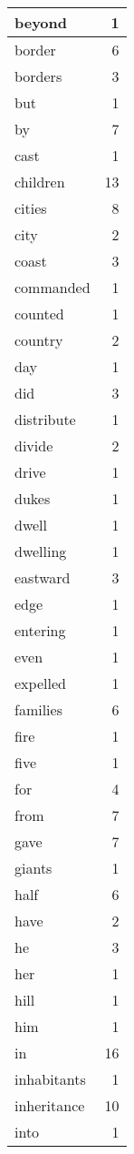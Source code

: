 \begin{center}
\begin{longtable}{l|r}
beyond & 1\\ \hline 
border & 6\\ \hline 
borders & 3\\ \hline 
but & 1\\ \hline 
by & 7\\ \hline 
cast & 1\\ \hline 
children & 13\\ \hline 
cities & 8\\ \hline 
city & 2\\ \hline 
coast & 3\\ \hline 
commanded & 1\\ \hline 
counted & 1\\ \hline 
country & 2\\ \hline 
day & 1\\ \hline 
did & 3\\ \hline 
distribute & 1\\ \hline 
divide & 2\\ \hline 
drive & 1\\ \hline 
dukes & 1\\ \hline 
dwell & 1\\ \hline 
dwelling & 1\\ \hline 
eastward & 3\\ \hline 
edge & 1\\ \hline 
entering & 1\\ \hline 
even & 1\\ \hline 
expelled & 1\\ \hline 
families & 6\\ \hline 
fire & 1\\ \hline 
five & 1\\ \hline 
for & 4\\ \hline 
from & 7\\ \hline 
gave & 7\\ \hline 
giants & 1\\ \hline 
half & 6\\ \hline 
have & 2\\ \hline 
he & 3\\ \hline 
her & 1\\ \hline 
hill & 1\\ \hline 
him & 1\\ \hline 
in & 16\\ \hline 
inhabitants & 1\\ \hline 
inheritance & 10\\ \hline 
into & 1\\ \hline 

\end{longtable}
\end{center}
